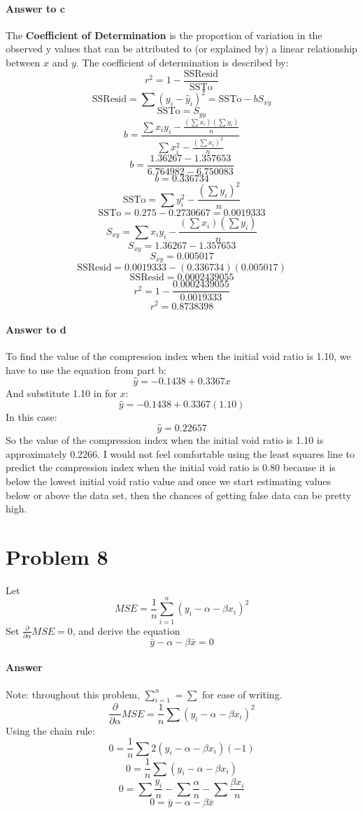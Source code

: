 \documentclass{article}
\newcommand{\p}[1]{\paragraph{#1}} %
\begin{document}
	\p{Answer to c}
	The \textbf{Coefficient of Determination} is the proportion of variation in the observed y values 
	that can be attributed to (or explained by) a linear relationship between $x$ and $y$. The 
	coefficient of determination is described by:
	\[ r^2 = 1 - \frac{\text{SSResid}}{\text{SSTo}} \]
	\[ \text{SSResid} = \sum(y_i-\hat{y}_i)^2 = \text{SSTo} - bS_{xy} \]
	\[ \text{SSTo} = S_{yy} \]
	\[ b = \frac{\sum x_iy_i - \frac{(\sum x_i)(\sum y_i)}{n}}{\sum x_i^2 - \frac{(\sum x_i)^2}{n}} \]
	\[ b = \frac{1.36267 - 1.357653}{6.764982 - 6.750083} \]
	\[ b = 0.336734 \]
	\[ \text{SSTo} = \sum y_i^2 - \frac{(\sum y_i)^2}{n} \]
	\[ \text{SSTo} = 0.275 - 0.2730667 = 0.0019333 \]
	\[ S_{xy} = \sum x_iy_i - \frac{(\sum x_i)(\sum y_i)}{n} \]
	\[ S_{xy} = 1.36267 - 1.357653 \]
	\[ S_{xy} = 0.005017 \]
	\[ \text{SSResid} = 0.0019333 - (0.336734)(0.005017) \]
	\[ \text{SSResid} = 0.0002439055 \]
	\[ r^2 = 1 - \frac{0.0002439055}{0.0019333} \]
	\[ r^2 = 0.8738398 \]
	
	\p{Answer to d}
	To find the value of the compression index when the initial void ratio is 1.10, we have to use the 
	equation from part b:
	\[ \hat{y} = -0.1438 + 0.3367x \]
	And substitute 1.10 in for $x$:
	\[ \hat{y} = -0.1438 + 0.3367(1.10) \]
	In this case:
	\[ \hat{y} = 0.22657 \]
	So the value of the compression index when the initial void ratio is 1.10 is approximately 
	0.2266. I would not feel comfortable using the least squares line to predict the compression 
	index when the initial void ratio is 0.80 because it is below the lowest initial void ratio value and 
	once we start estimating values below or above the data set, then the chances of getting false 
	data can be pretty high.
	
\clearpage
\section*{Problem 8} %

	Let
	\[ MSE = \frac{1}{n}\sum_{i=1}^{n}(y_i-\alpha-\beta x_i)^2 \]
	Set $\frac{\partial}{\partial\alpha}MSE = 0$, and derive the equation
	\[ \bar{y} - \alpha - \beta\bar{x} = 0 \]
	
	\p{Answer} Note: throughout this problem, $\sum_{i=1}^{n} = \sum$ for ease of writing.
	\[ \frac{\partial}{\partial\alpha}MSE = \frac{1}{n} \sum (y_i - \alpha - \beta x_i)^2 \]
	Using the chain rule:
	\[ 0 = \frac{1}{n}\sum 2(y_i-\alpha-\beta x_i)(-1) \]
	\[ 0 = \frac{1}{n}\sum (y_i - \alpha - \beta x_i) \]
	\[ 0 = \sum\frac{y_i}{n} - \sum\frac{\alpha}{n} - \sum\frac{\beta x_i}{n} \]
	\[ 0 = \bar{y} - \alpha - \beta\bar{x} \]
\end{document}
